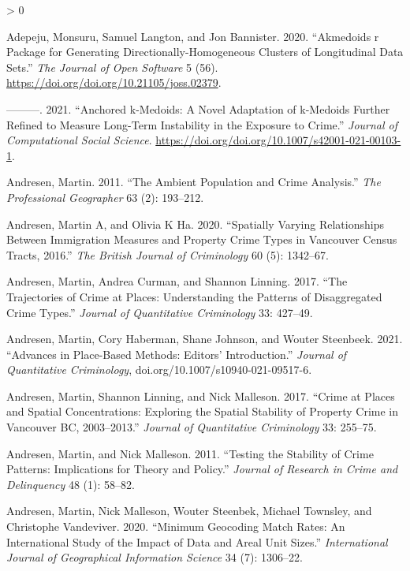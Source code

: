 \documentclass[
  krantz2]{krantz}
\newlength{\cslhangindent}
\newenvironment{CSLReferences}[2] %
 {%
  \setlength{\parindent}{0pt}
  \ifodd #1 \everypar{\setlength{\hangindent}{\cslhangindent}}\ignorespaces\fi
  \ifnum #2 > 0
  \setlength{\parskip}{#2\baselineskip}
  \fi
 }%
 {}
\begin{document}
\hypertarget{refs}{}
\begin{CSLReferences}{1}{0}
\leavevmode\hypertarget{ref-Adepeju_2020}{}%
Adepeju, Monsuru, Samuel Langton, and Jon Bannister. 2020. {``Akmedoids r Package for Generating Directionally-Homogeneous Clusters of Longitudinal Data Sets.''} \emph{The Journal of Open Software} 5 (56). \url{https://doi.org/doi.org/10.21105/joss.02379}.

\leavevmode\hypertarget{ref-Adepeju_2021}{}%
---------. 2021. {``Anchored k-Medoids: A Novel Adaptation of k-Medoids Further Refined to Measure Long-Term Instability in the Exposure to Crime.''} \emph{Journal of Computational Social Science}. \url{https://doi.org/doi.org/10.1007/s42001-021-00103-1}.

\leavevmode\hypertarget{ref-Andresen_2011}{}%
Andresen, Martin. 2011. {``The Ambient Population and Crime Analysis.''} \emph{The Professional Geographer} 63 (2): 193--212.

\leavevmode\hypertarget{ref-Andresen_2020b}{}%
Andresen, Martin A, and Olivia K Ha. 2020. {``Spatially Varying Relationships Between Immigration Measures and Property Crime Types in Vancouver Census Tracts, 2016.''} \emph{The British Journal of Criminology} 60 (5): 1342--67.

\leavevmode\hypertarget{ref-Andresen_2017}{}%
Andresen, Martin, Andrea Curman, and Shannon Linning. 2017. {``The Trajectories of Crime at Places: Understanding the Patterns of Disaggregated Crime Types.''} \emph{Journal of Quantitative Criminology} 33: 427--49.

\leavevmode\hypertarget{ref-Andresen_2021}{}%
Andresen, Martin, Cory Haberman, Shane Johnson, and Wouter Steenbeek. 2021. {``Advances in Place-Based Methods: Editors' Introduction.''} \emph{Journal of Quantitative Criminology}, doi.org/10.1007/s10940-021-09517-6.

\leavevmode\hypertarget{ref-Andresen_2017b}{}%
Andresen, Martin, Shannon Linning, and Nick Malleson. 2017. {``Crime at Places and Spatial Concentrations: Exploring the Spatial Stability of Property Crime in Vancouver BC, 2003--2013.''} \emph{Journal of Quantitative Criminology} 33: 255--75.

\leavevmode\hypertarget{ref-Andresen_2011b}{}%
Andresen, Martin, and Nick Malleson. 2011. {``Testing the Stability of Crime Patterns: Implications for Theory and Policy.''} \emph{Journal of Research in Crime and Delinquency} 48 (1): 58--82.

\leavevmode\hypertarget{ref-Andresen_2020}{}%
Andresen, Martin, Nick Malleson, Wouter Steenbek, Michael Townsley, and Christophe Vandeviver. 2020. {``Minimum Geocoding Match Rates: An International Study of the Impact of Data and Areal Unit Sizes.''} \emph{International Journal of Geographical Information Science} 34 (7): 1306--22.


\end{CSLReferences}
\end{document}
